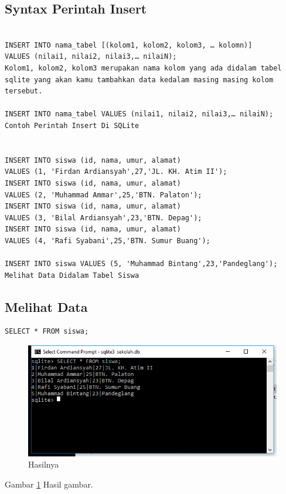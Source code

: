 \begin{enumerate}
		\subsection{Syntax Perintah Insert}
\begin{verbatim}

INSERT INTO nama_tabel [(kolom1, kolom2, kolom3, … kolomn)]
VALUES (nilai1, nilai2, nilai3,… nilaiN);
Kolom1, kolom2, kolom3 merupakan nama kolom yang ada didalam tabel sqlite yang akan kamu tambahkan data kedalam masing masing kolom tersebut.

INSERT INTO nama_tabel VALUES (nilai1, nilai2, nilai3,… nilaiN);
Contoh Perintah Insert Di SQLite


INSERT INTO siswa (id, nama, umur, alamat)
VALUES (1, 'Firdan Ardiansyah',27,'JL. KH. Atim II');
INSERT INTO siswa (id, nama, umur, alamat)
VALUES (2, 'Muhammad Ammar',25,'BTN. Palaton');
INSERT INTO siswa (id, nama, umur, alamat)
VALUES (3, 'Bilal Ardiansyah',23,'BTN. Depag');
INSERT INTO siswa (id, nama, umur, alamat)
VALUES (4, 'Rafi Syabani',25,'BTN. Sumur Buang');

INSERT INTO siswa VALUES (5, 'Muhammad Bintang',23,'Pandeglang'); 
Melihat Data Didalam Tabel Siswa
\end{verbatim}


	\subsection{Melihat Data}
		\begin{verbatim}
SELECT * FROM siswa;
		\end{verbatim}
		
	\begin{figure}[ht]
		\centerline{\includegraphics[width=1\textwidth]{figures/Sql.png}}
		\caption{Hasilnya}
		\label{Sql}
	\end{figure}
	Gambar \ref{Sql} Hasil gambar.
	

\end{enumerate}
